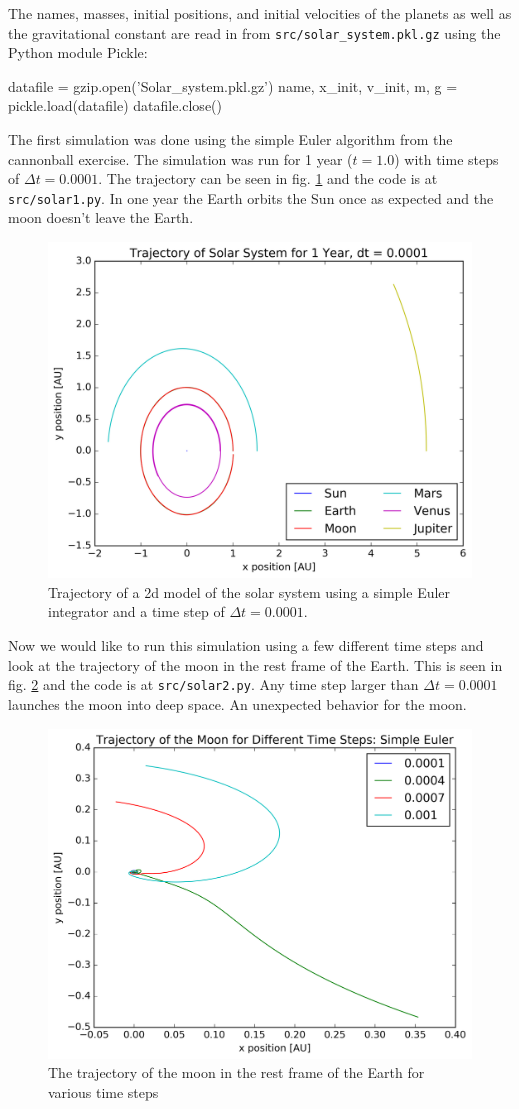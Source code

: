 \documentclass[a4paper,11pt,bibtotoc]{scrartcl}
\begin{document}
The names, masses, initial positions, and initial velocities of the planets as well as the gravitational constant are read in from \texttt{src/solar\_system.pkl.gz} using the Python module Pickle:
\begin{python}
datafile = gzip.open('Solar_system.pkl.gz')
name, x_init, v_init, m, g = pickle.load(datafile)
datafile.close()
\end{python}
The first simulation was done using the simple Euler algorithm from the cannonball exercise. The simulation was run for 1 year ($t = 1.0$) with time steps of $\Delta t = 0.0001$. The trajectory can be seen in fig. \ref{fig:solar1} and the code is at \texttt{src/solar1.py}. In one year the Earth orbits the Sun once as expected and the moon doesn't leave the Earth.
\begin{figure}
	\includegraphics[width=0.7\linewidth]{../fig/solar1.png}
	\centering
	\caption{Trajectory of a 2d model of the solar system using a simple Euler integrator and a time step of $\Delta t = 0.0001$.}
	\label{fig:solar1}
\end{figure}

Now we would like to run this simulation using a few different time steps and look at the trajectory of the moon in the rest frame of the Earth. This is seen in fig. \ref{fig:solar2} and the code is at \texttt{src/solar2.py}. Any time step larger than $\Delta t = 0.0001$ launches the moon into deep space. An unexpected behavior for the moon.
\begin{figure}
	\includegraphics[width=0.7\linewidth]{../fig/solar2.png}
	\centering
	\caption{The trajectory of the moon in the rest frame of the Earth for various time steps}
	\label{fig:solar2}
\end{figure}
\end{document}
